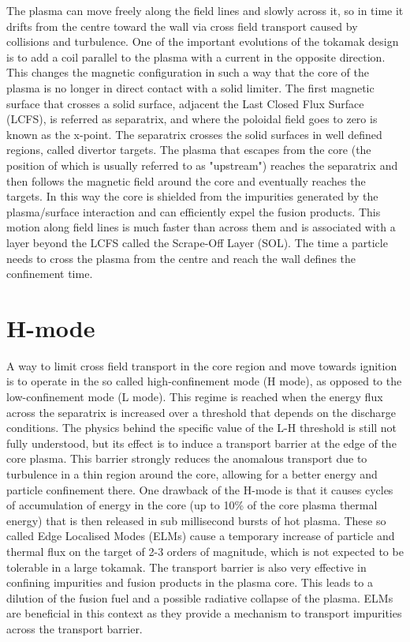 The plasma can move freely along the field lines and slowly across it, so in time it drifts from the centre toward the wall via cross field transport caused by collisions and turbulence. One of the important evolutions of the tokamak design is to add a coil parallel to the plasma with a current in the opposite direction. This changes the magnetic configuration in such a way that the core of the plasma is no longer in direct contact with a solid limiter. The first magnetic surface that crosses a solid surface, adjacent the Last Closed Flux Surface (LCFS), is referred as separatrix, and where the poloidal field goes to zero is known as the x-point. The separatrix crosses the solid surfaces in well defined regions, called divertor targets. The plasma that escapes from the core (the position of which is usually referred to as "upstream") reaches the separatrix and then follows the magnetic field around the core and eventually reaches the targets. In this way the core is shielded from the impurities generated by the plasma/surface interaction and can efficiently expel the fusion products. This motion along field lines is much faster than across them and is associated with a layer beyond the LCFS called the Scrape-Off Layer (SOL). The time a particle needs to cross the plasma from the centre and reach the wall defines the confinement time.

\section{H-mode}
A way to limit cross field transport in the core region and move towards ignition is to operate in the so called high-confinement mode (H mode), as opposed to the low-confinement mode (L mode). This regime is reached when the energy flux across the separatrix is increased over a threshold that depends on the discharge conditions.\cite{Ryter1998} The physics behind the specific value of the L-H threshold is still not fully understood, but its effect is to induce a transport barrier at the edge of the core plasma. This barrier strongly reduces the anomalous transport due to turbulence in a thin region around the core, allowing for a better energy and particle confinement there. One drawback of the H-mode is that it causes cycles of accumulation of energy in the core (up to 10\% of the core plasma thermal energy\cite{Zohm1996}) that is then released in sub millisecond bursts of hot plasma. These so called Edge Localised Modes (ELMs) cause a temporary increase of particle and thermal flux on the target of 2-3 orders of magnitude, which is not expected to be tolerable in a large tokamak.\cite{Jachmich2011} The transport barrier is also very effective in confining impurities and fusion products in the plasma core.\cite{Putterich2011} This leads to a dilution of the fusion fuel and a possible radiative collapse of the plasma. ELMs are beneficial in this context as they provide a mechanism to transport impurities across the transport barrier.\cite{Leonard2014}

